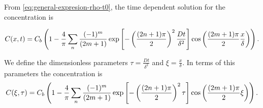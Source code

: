 From \ref{eq:general-expresion-rho-t0}, the time dependent solution for the concentration is

\begin{align}
	C(x,t) = C_b\left({1-\frac{4}{\pi} \sum_n \frac{(-1)^m}{(2m+1)}\exp\left[{-\left({\frac{(2n+1)\pi}{2}}\right)^2\frac{D t}{\delta^2}}\right]\cos\left({\frac{(2m+1)\pi}{2} \frac{x}{\delta}}\right)}\right).
	\label{eq:solution-diffusion}
\end{align}


We define the dimensionless parameters $\tau = \frac{D t}{\delta^2}$ and $\xi = \frac{x}{\delta}$. In terms of this parameters the concentration is
\begin{align}
\label{eq:solution-diffusion-appendix}
	C(\xi,\tau) = C_b\left({1-\frac{4}{\pi} \sum_n \frac{(-1)^m}{(2m+1)}\exp\left[{-\left({\frac{(2n+1)\pi}{2}}\right)^2\tau}\right]\cos\left({\frac{(2m+1)\pi}{2} \xi}\right)}\right).
\end{align}

